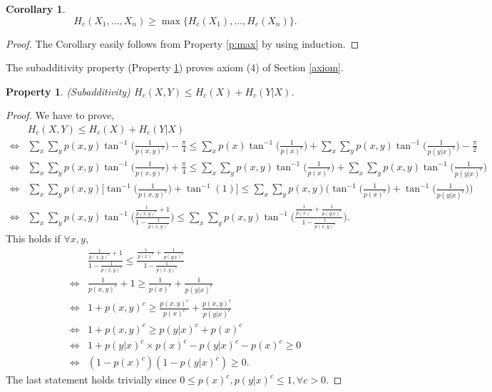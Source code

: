 \documentclass{article}
\newtheorem{cor}{Corollary}
\newtheorem{prop}{Property}
\begin{document}
\begin{cor}
$$H_c(X_1,\dots,X_n) \geq \max\{H_c(X_1),\dots, H_c(X_n)\}.$$
\end{cor}
\begin{proof}
The Corollary easily follows from Property \ref{p:max} by using induction.
\end{proof}

The subadditivity property (Property \ref{p:cond sum}) proves axiom (4) of Section \ref{axiom}.
\begin{prop}
\label{p:cond sum}
(Subadditivity) $H_c(X,Y)\leq H_c(X)+H_c(Y|X)$.
\end{prop}
\begin{proof}
We have to prove,\\
\begingroup
\allowdisplaybreaks
\begin{align*}
 & H_c(X,Y) \leq H_c(X)+H_c(Y|X)\\
\iff & \sum_x\sum_y p(x,y)\tan^{-1}\bigg(\frac{1}{p(x,y)^c}\bigg)-\frac{\pi}{4} \leq\sum_x p(x)\tan^{-1}\bigg(\frac{1}{p(x)^c}\bigg) +\sum_x\sum_y p(x,y) \tan^{-1}\bigg(\frac{1}{p(y|x)^c}\bigg)-\frac{\pi}{2}\\
\iff & \sum_x\sum_y p(x,y) \tan^{-1}\bigg(\frac{1}{p(x,y)^c}\bigg)+\frac{\pi}{4} \leq \sum_x\sum_y p(x,y) \tan^{-1}\bigg(\frac{1}{p(x)^c}\bigg) +\sum_x\sum_y p(x,y) \tan^{-1}\bigg(\frac{1}{p(y|x)^c}\bigg)\\
\iff & \sum_x\sum_y p(x,y) \Bigg[\tan^{-1}\bigg(\frac{1}{p(x,y)^c}\bigg)+ \tan^{-1}(1)\Bigg] \leq \sum_x\sum_y p(x,y)\bigg(\tan^{-1}\bigg(\frac{1}{p(x)^c}\bigg)
 +\tan^{-1}\bigg(\frac{1}{p(y|x)^c}\bigg)\bigg)\\
\iff & \sum_x\sum_y p(x,y) \tan^{-1}\bigg(\frac{\frac{1}{p(x,y)^c}+1}{1-\frac{1}{p(x,y)^c}}\bigg) \leq \sum_x\sum_y p(x,y) \tan^{-1}\bigg(\frac{\frac{1}{p(x)^c}+\frac{1}{p(y|x)^c}}{1-\frac{1}{p(x,y)^c}}\bigg).
\end{align*}
 \endgroup
This holds if $\forall x,y$,
\begin{align*}
     & \frac{\frac{1}{p(x,y)^c}+1}{1-\frac{1}{p(x,y)^c}} \leq \frac{\frac{1}{p(x)^c}+\frac{1}{p(y|x)^c}}{1-\frac{1}{p(x,y)^c}}\\
\iff & \frac{1}{p(x,y)^c}+1 \geq \frac{1}{p(x)^c}+\frac{1}{p(y|x)^c}\\
\iff & 1+p(x,y)^c \geq \frac{p(x,y)^c}{p(x)^c}+\frac{p(x,y)^c}{p(y|x)^c}\\
\iff & 1+p(x,y)^c \geq p(y|x)^c+p(x)^c\\
\iff & 1+p(y|x)^c\times p(x)^c-p(y|x)^c-p(x)^c \geq 0\\
\iff & (1-p(x)^c)(1-p(y|x)^c)\geq 0.
\end{align*}
The last statement holds trivially since $0\leq p(x)^c,p(y|x)^c\leq 1, \forall c>0$.
\end{proof}
\end{document}
